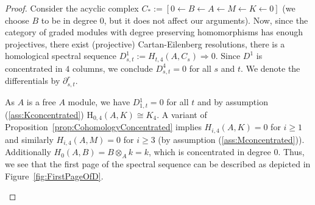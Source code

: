 \documentclass{amsart}
\theoremstyle{definition}
\theoremstyle{remark}
\newcommand{\rmH}{\mathrm{H}}
\numberwithin{equation}{section}
\begin{document}
\begin{proof}
    Consider the acyclic complex $C_*:=[0\leftarrow B\leftarrow A \leftarrow M\leftarrow K\leftarrow 0]$ (we choose $B$ to be in degree $0$, but it does not affect our arguments). Now, since the category of graded modules with degree preserving homomorphisms has enough projectives, there exist (projective) Cartan-Eilenberg resolutions, there is a homological spectral sequence $D^1_{s,t}:=H_{t,4}(A,C_s)\Rightarrow 0$. Since $D^1$ is concentrated in $4$ columns, we conclude $D^4_{s,t}=0$ for all $s$ and $t$. We denote the differentials by $\partial^r_{s,t}$.

    As $A$ is a free $A$ module, we have ${D}{^1_{1,t}}=0$ for all $t$ and by assumption (\ref{ass:Kconcentrated}) $\rmH_{0,4}(A,K)\cong K_4$. A variant of Proposition~\ref{prop:CohomologyConcentrated} implies $H_{i,4}(A,K)=0$ for $i\geq 1$ and similarly $H_{i,4}(A,M)=0$ for $i\geq 3$ (by assumption (\ref{ass:Mconcentrated})). Additionally $H_0(A,B)=B\otimes_Ak=k$, which is concentrated in degree $0$. Thus, we see that the first page of the spectral sequence can be described as depicted in Figure~\ref{fig:FirstPageOfD}.

    \begin{figure}[ht]
        \centering
\end{figure}
\end{proof}
\end{document}
